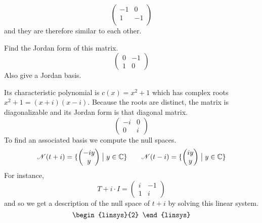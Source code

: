 \begin{exercises}
\begin{answer}
\begin{equation*}
           \begin{pmatrix}
             -1  &0  \\
              1  &-1 \\
           \end{pmatrix}
        \end{equation*}
        and they are therefore similar to each other.  
      \end{answer}
  \item 
     Find the Jordan form of this matrix.
     \begin{equation*}
        \begin{pmatrix}
           0  &-1  \\
           1  &0
        \end{pmatrix}
     \end{equation*}
     Also give a Jordan basis.
     \begin{answer}
       Its characteristic polynomial is
       \( c(x)=x^2+1 \) which has complex roots
       \( x^2+1=(x+i)(x-i) \).
       Because the roots are distinct,
       the matrix is diagonalizable and its Jordan form is that
       diagonal matrix. 
       \begin{equation*}
         \begin{pmatrix}
           -i  &0  \\
            0  &i
         \end{pmatrix}
       \end{equation*}  
       To find an associated basis we compute the null spaces.
       \begin{equation*}
         \mathscr{N}(t+i)=\mbox{$\{\begin{pmatrix} -iy \\ y \end{pmatrix}
                                        \bigm| y\in\mathbb{C}\}$} 
         \qquad
         \mathscr{N}(t-i)=\mbox{$\{\begin{pmatrix} iy \\ y \end{pmatrix}
                                        \bigm| y\in\mathbb{C}\}$} 
       \end{equation*}
       For instance, 
       \begin{equation*}
         T+i\cdot I=
         \begin{pmatrix}
           i  &-1  \\
           1  &i
         \end{pmatrix}
       \end{equation*}
       and so we get a description of the null space of $t+i$ by solving
       this linear system.
       \begin{equation*}
         \begin{linsys}{2}

\end{linsys}
\end{equation*}
\end{answer}
\end{exercises}
